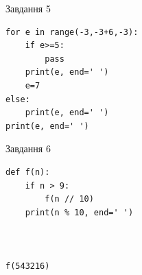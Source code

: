 \documentclass[12pt, ukrainian]{article}
\begin{document}
{\vspace{15mm}
\begin{minipage}[t]{9.7cm}                
{\begin{center}Завдання {5}\end{center}}
\begin{verbatim}
for e in range(-3,-3+6,-3):
    if e>=5:
        pass
    print(e, end=' ')
    e=7
else:
    print(e, end=' ')
print(e, end=' ')
\end{verbatim}     
\end{minipage}
\vline \hspace{8mm}
\begin{minipage}[t]{8.0cm}                
{\begin{center}Завдання {6}\end{center}}
\begin{verbatim}
def f(n):
    if n > 9:
        f(n // 10)
    print(n % 10, end=' ')
    


f(543216)
\end{verbatim}     
\end{minipage}

}
\newpage
\end{document}

